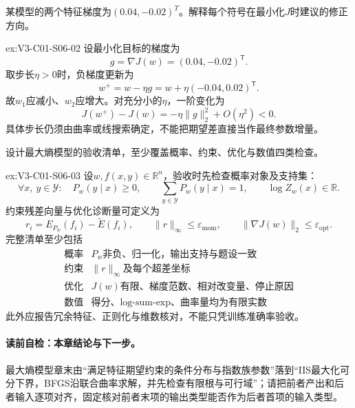 \begin{SLChapterExercisePairSection}
\begin{exercise}\label{ex:V3-C01-S06-02}
某模型的两个特征梯度为$(0.04,-0.02)^T$。解释每个符号在最小化$J$时建议的修正方向。
\end{exercise}
\ifSLFullEdition
{}\label{sol:V3-C01-S06-02}
\begin{chapterexercisesolution}{ex:V3-C01-S06-02}
设最小化目标的梯度为
\[
g=\nabla J(w)=(0.04,-0.02)^{\mathsf T}.
\]
取步长$\eta>0$时，负梯度更新为
\[
w^+=w-\eta g
=w+\eta(-0.04,0.02)^{\mathsf T}.
\]
故$w_1$应减小、$w_2$应增大。对充分小的$\eta$，一阶变化为
\[
J(w^+)-J(w)
=-\eta\lVert g\rVert_2^2+O(\eta^2)<0.
\]
具体步长仍须由曲率或线搜索确定，不能把期望差直接当作最终参数增量。
\end{chapterexercisesolution}
\fi

\begin{exercise}\label{ex:V3-C01-S06-03}
设计最大熵模型的验收清单，至少覆盖概率、约束、优化与数值四类检查。
\end{exercise}
\ifSLFullEdition
{}\label{sol:V3-C01-S06-03}
\begin{chapterexercisesolution}{ex:V3-C01-S06-03}
设$w,f(x,y)\in\mathbb R^n$，验收时先检查概率对象及支持集：
\[
\forall x,\ y\in\mathcal Y:\quad
P_w(y\mid x)\geq0,
\qquad
\sum_{y\in\mathcal Y}P_w(y\mid x)=1,
\qquad
\log Z_w(x)\in\mathbb R.
\]
约束残差向量与优化诊断量可定义为
\[
r_i=E_{P_w}(f_i)-\widetilde E(f_i),
\qquad
\lVert r\rVert_\infty\leq\varepsilon_{\mathrm{mom}},
\qquad
\lVert\nabla J(w)\rVert_2\leq\varepsilon_{\mathrm{opt}}.
\]
完整清单至少包括
\[
\begin{array}{c|l}
\text{概率}&P_w\text{非负、归一化，输出支持与题设一致}\\
\text{约束}&\lVert r\rVert_\infty\text{及每个超差坐标}\\
\text{优化}&J(w)\text{有限、梯度范数、相对改变量、停止原因}\\
\text{数值}&\text{得分、log-sum-exp、曲率量均为有限实数}
\end{array}
\]
此外应报告冗余特征、正则化与维数核对，不能只凭训练准确率验收。
\end{chapterexercisesolution}
\fi

\end{SLChapterExercisePairSection}

\paragraph{读前自检：本章结论与下一步。}最大熵模型章末由“满足特征期望约束的条件分布与指数族参数”落到“IIS最大化可分下界，BFGS沿联合曲率求解，并先检查有限根与可行域”；请把前者产出和后者输入逐项对齐，固定核对前者末项的输出类型能否作为后者首项的输入类型。\par

